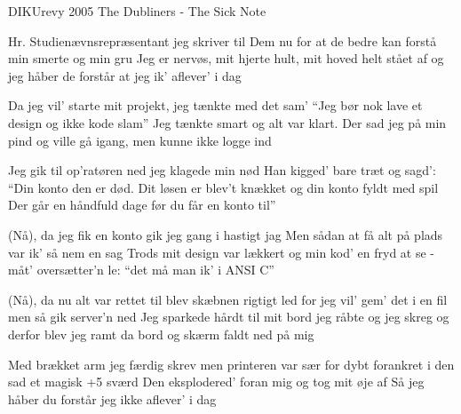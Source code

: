 {DIKUrevy 2005}
{The Dubliners - The Sick Note}
{
Hr. Studienævnsrepræsentant
jeg skriver til Dem nu
for at de bedre kan forstå
min smerte og min gru
Jeg er nervøs, mit hjerte hult, 
mit hoved helt stået af
og jeg håber de forstår 
at jeg ik' aflever' i dag

Da jeg vil' starte mit projekt,
jeg tænkte med det sam'
``Jeg bør nok lave et design
og ikke kode slam''
Jeg tænkte smart og alt var klart. 
Der sad jeg på min pind
og ville gå igang, 
men kunne ikke logge ind

Jeg gik til op'ratøren ned
jeg klagede min nød
Han kigged' bare træt og sagd':
``Din konto den er død.
Dit løsen er blev't knækket og
din konto fyldt med spil
Der går en håndfuld dage før
du får en konto til''

(Nå), da jeg fik en konto
gik jeg gang i hastigt jag
Men sådan at få alt på plads
var ik' så nem en sag
Trods mit design var lækkert og 
min kod' en fryd at se
- måt' oversætter'n le: 
``det må man ik' i ANSI C''

(Nå), da nu alt var rettet til
blev skæbnen rigtigt led
for jeg vil' gem' det i en fil
men så gik server'n ned
Jeg sparkede hårdt til mit bord
jeg råbte og jeg skreg
og derfor blev jeg ramt
da bord og skærm faldt ned på mig

Med brækket arm jeg færdig skrev
men printeren var sær
for dybt forankret i den
sad et magisk +5 sværd
Den eksplodered' foran mig
og tog mit øje af
Så jeg håber du forstår
jeg ikke aflever' i dag  
}